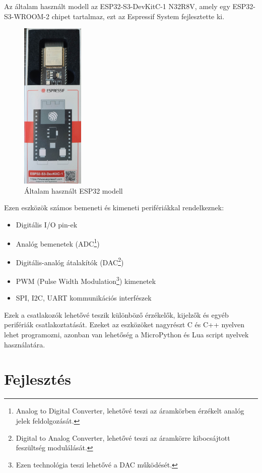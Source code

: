 \documentclass{thesis-ekf}
\theoremstyle{definition}
\theoremstyle{remark}
\begin{document}
	
	Az általam  használt modell az ESP32-S3-DevKitC-1 N32R8V, amely egy ESP32-S3-WROOM-2 chipet tartalmaz, ezt az Espressif System fejlesztette ki.
	\begin{figure}[!ht]
		\centering
		\includegraphics[width=3cm]{MyESP32}
		\caption{Általam használt ESP32 modell}
		\label{img_myesp}
	\end{figure}
	
	Ezen eszközök számos bemeneti és kimeneti perifériákkal rendelkeznek:
	\begin{itemize}
		\item Digitális I/O pin-ek
		\item Analóg bemenetek (ADC\footnote{Analog to Digital Converter, lehetővé teszi az áramkörben érzékelt analóg jelek feldolgozását.})
		\item Digitális-analóg átalakítók (DAC\footnote{Digital to Analog Converter, lehetővé teszi az áramkörre kibocsájtott feszültség modulálását.})
		\item PWM (Pulse Width Modulation\footnote{Ezen technológia teszi lehetővé a DAC működését.}) kimenetek
		\item SPI, I2C, UART kommunikációs interfészek
	\end{itemize}
	Ezek a csatlakozók lehetővé teszik különböző érzékelők, kijelzők és egyéb perifériák csatlakoztatását.
	Ezeket az eszközöket nagyrészt C és C++ nyelven lehet programozni, azonban van lehetőség a MicroPython és Lua script nyelvek használatára.
	\section{Fejlesztés}
\end{document}
